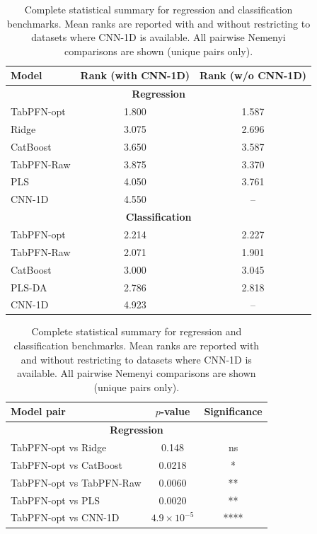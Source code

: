 \documentclass{article}
\renewcommand{\arraystretch}{1.12}
\begin{document}
\begin{table}[!htbp]
\centering
\caption{Complete statistical summary for regression and classification benchmarks. Mean ranks are reported with and without restricting to datasets where CNN-1D is available. All pairwise Nemenyi comparisons are shown (unique pairs only).}
\label{tab:cd_stats_full}
\small
\setlength{\tabcolsep}{5pt}
\renewcommand{\arraystretch}{1.2}

\begin{tabular}{lcc}
\toprule
Model & Rank (with CNN-1D) & Rank (w/o CNN-1D) \\
\midrule

\multicolumn{3}{c}{\textbf{Regression}} \\
\midrule
TabPFN-opt & 1.800 & 1.587 \\
Ridge      & 3.075 & 2.696 \\
CatBoost   & 3.650 & 3.587 \\
TabPFN-Raw & 3.875 & 3.370 \\
PLS        & 4.050 & 3.761 \\
CNN-1D     & 4.550 & -- \\

\midrule
\multicolumn{3}{c}{\textbf{Classification}} \\
\midrule
TabPFN-opt & 2.214 & 2.227 \\
TabPFN-Raw & 2.071 & 1.901 \\
CatBoost   & 3.000 & 3.045 \\
PLS-DA     & 2.786 & 2.818 \\
CNN-1D     & 4.923 & -- \\

\bottomrule
\end{tabular}

\vspace{0.8em}

\begin{tabular}{lcc}
\toprule
Model pair & $p$-value & Significance \\
\midrule

\multicolumn{3}{c}{\textbf{Regression}} \\
\midrule
TabPFN-opt vs Ridge      & 0.148 & ns \\
TabPFN-opt vs CatBoost   & 0.0218 & * \\
TabPFN-opt vs TabPFN-Raw & 0.0060 & ** \\
TabPFN-opt vs PLS        & 0.0020 & ** \\
TabPFN-opt vs CNN-1D     & $4.9 \times 10^{-5}$ & **** \\


\end{tabular}
\end{table}
\end{document}
